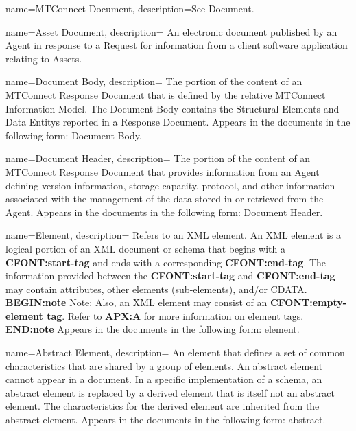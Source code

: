 {
    name={MTConnect Document},
	description={See \gls{Document}.}
}

{
    name={Asset Document},
	description={
	An electronic document published by an \gls{Agent} in response to a \gls{Request} for information from a client software application relating to Assets.
}
}

{
    name={Document Body},
	description={
	The portion of the content of an \gls{MTConnect Response Document} that is defined by the relative \gls{MTConnect Information Model}. The \gls{Document Body} contains the \glspl{Structural Element} and \glspl{Data Entity} reported in a \gls{Response Document}.
	Appears in the documents in the following form: \gls{Document Body}.
}
}

{
    name={Document Header},
	description={
	The portion of the content of an \gls{MTConnect Response Document} that provides information from an \gls{Agent} defining version information, storage capacity, protocol, and other information associated with the management of the data stored in or retrieved from the \gls{Agent}.
	Appears in the documents in the following form: \gls{Document Header}.
}
}

{
    name={Element},
	description={
	Refers to an XML element.
	An XML element is a logical portion of an XML document or schema that begins with a \textbf{CFONT:start-tag} and ends with a corresponding \textbf{CFONT:end-tag}.  
	The information provided between the \textbf{CFONT:start-tag} and \textbf{CFONT:end-tag} may contain attributes, other elements (sub-elements), and/or CDATA.
    \textbf{BEGIN:note}
	Note:  Also, an XML element may consist of an \textbf{CFONT:empty-element tag}.  Refer to \textbf{APX:A} for more information on element tags.
    \textbf{END:note}
	Appears in the documents in the following form: element.
}
}

{
    name={Abstract Element},
	description={
  An element that defines a set of common characteristics that are shared by a group of elements.
  An abstract element cannot appear in a document. In a specific implementation of a schema, an abstract element is replaced by a derived element that is itself not an abstract element. The characteristics for the derived element are inherited from the abstract element. 
  Appears in the documents in the following form: abstract.
}
}

